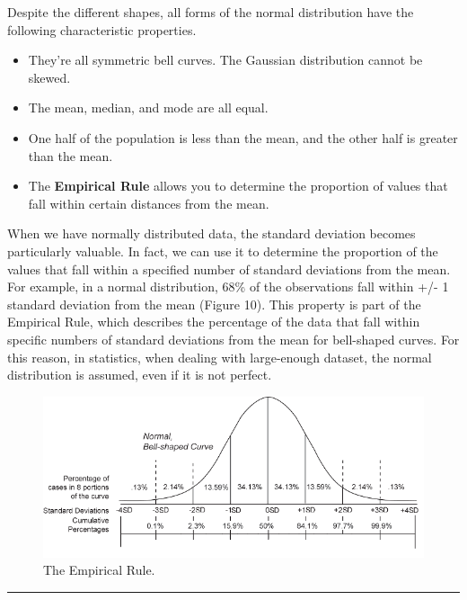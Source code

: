 \documentclass[
]{article}
\begin{document}
Despite the different shapes, all forms of the normal distribution have
the following characteristic properties.

\begin{itemize}
\item
  They're all symmetric bell curves. The Gaussian distribution cannot
  be skewed.
\item
  The mean, median, and mode are all equal.
\item
  One half of the population is less than the mean, and the other half
  is greater than the mean.
\item
  The \textbf{Empirical Rule} allows you to determine the proportion of
  values that fall within certain distances from the mean.
\end{itemize}

When we have normally distributed data, the standard deviation becomes
particularly valuable. In fact, we can use it to determine the
proportion of the values that fall within a specified number of standard
deviations from the mean. For example, in a normal distribution, 68\% of
the observations fall within +/- 1 standard deviation from the mean
(Figure 10). This property is part of the Empirical Rule, which
describes the percentage of the data that fall within specific numbers
of standard deviations from the mean for bell-shaped curves. For this
reason, in statistics, when dealing with large-enough dataset, the
normal distribution is assumed, even if it is not perfect.

\begin{figure}[H]

{\centering \includegraphics[width=0.8\linewidth,]{images/Senza titolo} 

}

\caption{The Empirical Rule.}\label{fig:unnamed-chunk-56}
\end{figure}

\begin{center}\rule{0.5\linewidth}{0.5pt}\end{center}
\end{document}
